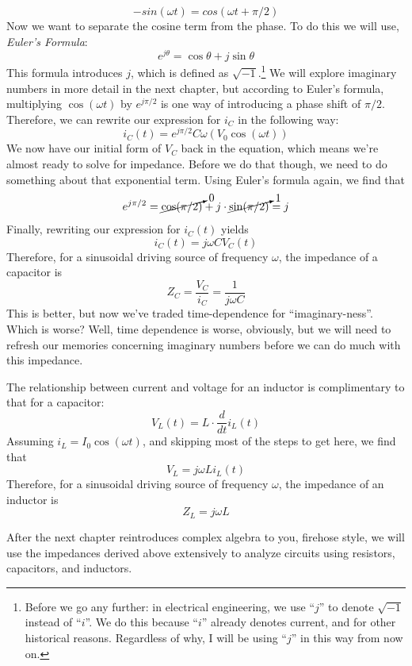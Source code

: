 $$
-sin(\omega t) = cos(\omega t + \pi/2)
$$
Now we want to separate the cosine term from the phase. To do this we will use, \textit{Euler's Formula}:
$$
e^{j\theta} = \cos{\theta} + j\sin{\theta}
$$
This formula introduces $j$, which is defined as $\sqrt{-1}$.\footnote{Before we go any further: in electrical engineering, we use ``$j$'' to denote $\sqrt{-1}$ instead of ``$i$''. We do this because ``$i$'' already denotes current, and for other historical reasons. Regardless of why, I will be using ``$j$'' in this way from now on.} We will explore imaginary numbers in more detail in the next chapter, but according to Euler's formula, multiplying $\cos(\omega t)$ by $e^{j\pi/2}$ is one way of introducing a phase shift of $\pi/2$. Therefore, we can rewrite our expression for $i_C$ in the following way:
$$
i_C(t) = e^{j\pi/2} C \omega \left(V_0 \cos(\omega t)\right)
$$
We now have our initial form of $V_C$ back in the equation, which means we're almost ready to solve for impedance. Before we do that though, we need to do something about that exponential term. Using Euler's formula again, we find that 
$$
e^{j\pi/2} = \cancelto{0}{\cos(\pi/2)} + j\cdot\cancelto{1}{\sin(\pi/2)}=j
$$
Finally, rewriting our expression for $i_C(t)$ yields 
$$
i_C(t) = j\omega C V_C(t)
$$
Therefore, for a sinusoidal driving source of frequency $\omega$, the impedance of a capacitor is
$$
Z_C = \frac{V_C}{i_C} = \frac{1}{j\omega C}
$$
This is better, but now we've traded time-dependence for ``imaginary-ness''. Which is worse? Well, time dependence is worse, obviously, but we will need to refresh our memories concerning imaginary numbers before we can do much with this impedance.
\par
The relationship between current and voltage for an inductor is complimentary to that for a capacitor:
$$
V_L(t) = L \cdot \frac{d}{dt}i_L(t)
$$
Assuming $i_L=I_0\cos(\omega t)$, and skipping most of the steps to get here, we find that 
$$
V_L = j\omega L i_L(t)
$$
Therefore, for a sinusoidal driving source of frequency $\omega$, the impedance of an inductor is
$$
Z_L = j\omega L
$$
\par
After the next chapter reintroduces complex algebra to you, firehose style, we will use the impedances derived above extensively to analyze circuits using resistors, capacitors, and inductors.
